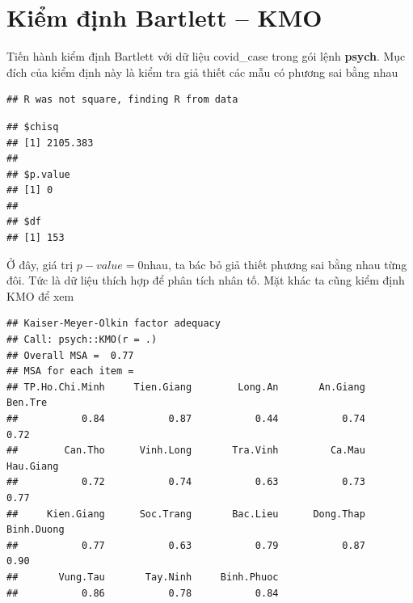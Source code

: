 \documentclass[../thesis.tex]{subfiles}
\begin{document}
\newpage
\section{Kiểm định Bartlett -- KMO}

Tiến hành kiểm định Bartlett với dữ liệu \textsf{covid\_case} trong gói lệnh \textbf{psych}. Mục đích của kiểm định này là kiểm tra giả thiết các mẫu có phương sai bằng nhau 

\begin{Shaded}
	\begin{Highlighting}[]
\SpecialCharTok{\%\textgreater{}\%}\SpecialCharTok{::}\NormalTok{()}
	\end{Highlighting}
\end{Shaded}

\begin{verbatim}
## R was not square, finding R from data
\end{verbatim}

\begin{verbatim}
## $chisq
## [1] 2105.383
## 
## $p.value
## [1] 0
## 
## $df
## [1] 153
\end{verbatim}

Ở đây, giá trị $ p-value = 0 $nhau, ta bác bỏ giả thiết phương sai bằng nhau từng đôi. Tức là dữ liệu thích hợp để phân tích nhân tố. Mặt khác ta cũng kiểm định KMO để xem 

\begin{Shaded}
	\begin{Highlighting}[]
\SpecialCharTok{\%\textgreater{}\%}\SpecialCharTok{::}\NormalTok{()}
	\end{Highlighting}
\end{Shaded}

\begin{verbatim}
## Kaiser-Meyer-Olkin factor adequacy
## Call: psych::KMO(r = .)
## Overall MSA =  0.77
## MSA for each item = 
## TP.Ho.Chi.Minh     Tien.Giang        Long.An       An.Giang        Ben.Tre 
##           0.84           0.87           0.44           0.74           0.72 
##        Can.Tho      Vinh.Long       Tra.Vinh         Ca.Mau      Hau.Giang 
##           0.72           0.74           0.63           0.73           0.77 
##     Kien.Giang      Soc.Trang       Bac.Lieu      Dong.Thap     Binh.Duong 
##           0.77           0.63           0.79           0.87           0.90 
##       Vung.Tau       Tay.Ninh     Binh.Phuoc 
##           0.86           0.78           0.84
\end{verbatim}
\end{document}
